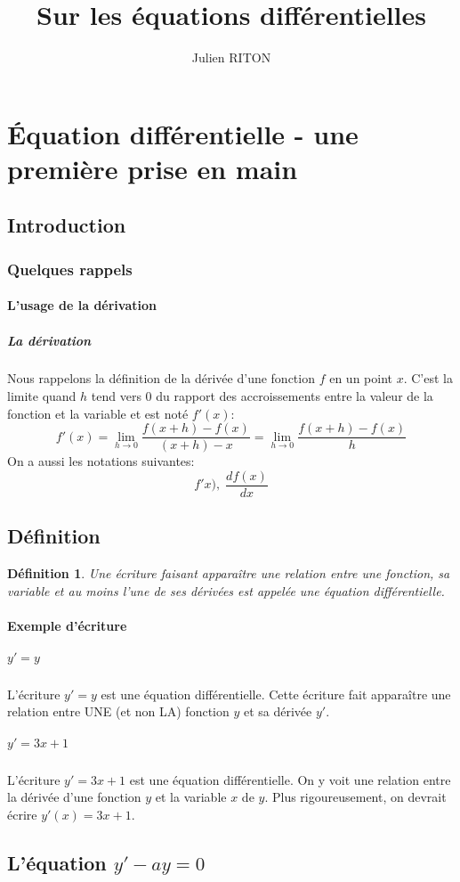\documentclass[10pt,a4paper]{article}
\author{Julien RITON}
\title{Sur les équations différentielles}
\newtheorem{dfn}{Définition}
\begin{document}
\maketitle
\section{Équation différentielle - une première prise en main}

\subsection{Introduction}
\subsubsection{Quelques rappels}
\paragraph{L'usage de la dérivation}
\subparagraph{La dérivation}
Nous rappelons la définition de la dérivée d'une fonction $f$ en un point $x$.
C'est la limite quand $h$ tend vers $0$ du rapport des accroissements entre la valeur de la fonction et la variable et est noté $f'(x)$:
$$
f'(x)=\lim_{h\rightarrow 0} \dfrac{f(x+h)-f(x)}{(x+h)-x}
=\lim_{h\rightarrow 0} \dfrac{f(x+h)-f(x)}{h}
$$
On a aussi les notations suivantes:
$$f'x), \; \dfrac{df(x)}{dx} $$
\subsection{Définition}
\begin{dfn}
Une écriture faisant apparaître une relation entre une fonction, sa variable et au moins l'une de ses dérivées est appelée une équation différentielle.
\end{dfn}
\paragraph{Exemple d'écriture}

\subparagraph{$y'=y$}
L'écriture $y'=y$ est une équation différentielle. Cette écriture fait apparaître une relation entre UNE (et non LA) fonction $y$
et sa dérivée $y'$.

\subparagraph{$y'= 3x+1$}
L'écriture $y'= 3x+1$ est une équation différentielle. On y voit une relation entre la dérivée d'une fonction $y$ et la variable $x$ de $y$. Plus rigoureusement, on devrait écrire $y'(x)=3x+1$.


\subsection{L'équation $y'-ay=0$}
\end{document}
